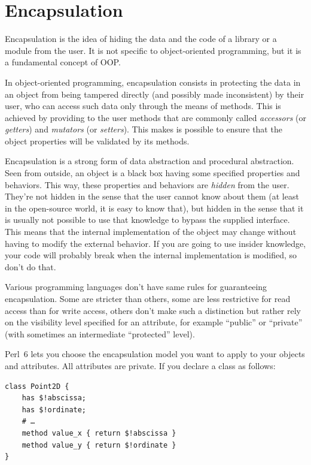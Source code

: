 \section{Encapsulation}

Encapsulation is the idea of hiding the data and the code 
of a library or a module from the user. It is not specific to 
object-oriented programming, but it is a fundamental concept 
of OOP.

In object-oriented programming, encapsulation consists in 
protecting the data in an object from being tampered 
directly (and possibly made inconsistent) 
by their user, who can access such data only through
the means of methods. This is achieved by providing to the 
user methods that are commonly called \emph{accessors} (or 
\emph{getters}) and \emph{mutators} (or \emph{setters}). This 
makes is possible to ensure that the object properties will 
be validated by its methods.

Encapsulation is a strong form of data abstraction and 
procedural abstraction. Seen from outside, an object 
is a black box having some specified properties and 
behaviors. This way, these properties and behaviors are 
\emph{hidden} from the user. They're not hidden in the 
sense that the user cannot know about them (at least in 
the open-source world, it is easy to know that), but 
hidden in the sense that it is usually not possible to 
use that knowledge to bypass the supplied interface. This 
means that the internal implementation of the object may 
change without having to modify the external behavior. If you 
are going to use insider knowledge, your code will 
probably break when the internal implementation is 
modified, so don't do that.

Various programming languages don't have same rules for 
guaranteeing encapsulation. Some are stricter than others, 
some are less restrictive for read access than for write access, 
others don't make such a distinction but rather rely on the 
visibility level specified for an attribute, for example 
``public'' or ``private'' (with sometimes an intermediate 
``protected'' level).

Perl~6 lets you choose the encapsulation model you want to 
apply to your objects and attributes. All attributes are 
private. If you declare a class as follows:

\begin{verbatim}
class Point2D {
    has $!abscissa;
    has $!ordinate;
    # …
    method value_x { return $!abscissa }
    method value_y { return $!ordinate }
}
\end{verbatim}

